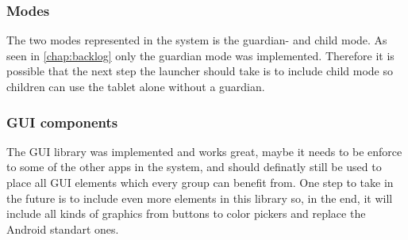 \subsubsection{Modes}
\label{epi:modes}
The two modes represented in the \giraf[] system is the guardian- and child mode. As seen in \autoref{chap:backlog} only the guardian mode was implemented. Therefore it is possible that the next step the launcher should take is to include child mode so children can use the tablet alone without a guardian.

\subsubsection{\giraf[] GUI components}
\label{epi:giraf_GUI_components}
The \giraf GUI library was implemented and works great, maybe it needs to be enforce to some of the other apps in the system, and should definatly still be used to place all GUI elements which every group can benefit from.
One step to take in the future is to include even more elements in this library so, in the end, it will include all kinds of graphics from buttons to color pickers and replace the Android standart ones.